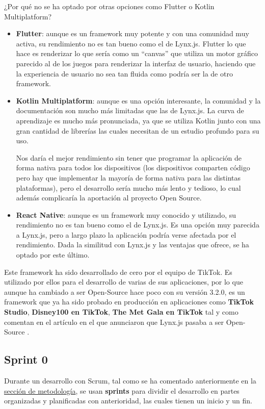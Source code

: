 ¿Por qué no se ha optado por otras opciones como Flutter o Kotlin Multiplatform?
\begin{itemize}
    \item \textbf{Flutter}: aunque es un framework muy potente y con una comunidad muy activa, su rendimiento no es tan bueno como el de Lynx.js.
        Flutter lo que hace es renderizar lo que sería como un ``canvas'' que utiliza un motor gráfico parecido al de los juegos para renderizar la interfaz de usuario, haciendo que la experiencia de usuario no sea tan fluida como podría ser la de otro framework.
    \item \textbf{Kotlin Multiplatform}: aunque es una opción interesante, la comunidad y la documentación son mucho más limitadas que las de Lynx.js. La curva de aprendizaje es mucho más pronunciada, ya que se utiliza Kotlin junto con una gran cantidad de librerías las cuales necesitan de un estudio profundo para su uso.

        Nos daría el mejor rendimiento sin tener que programar la aplicación de forma nativa para todos los dispositivos (los dispositivos comparten código pero hay que implementar la mayoría de forma nativa para las distintas plataformas), pero el desarrollo sería mucho más lento y tedioso, lo cual además complicaría la aportación al proyecto Open Source.
    \item \textbf{React Native}: aunque es un framework muy conocido y utilizado, su rendimiento no es tan bueno como el de Lynx.js.
        Es una opción muy parecida a Lynx.js, pero a largo plazo la aplicación podría verse afectada por el rendimiento.
        Dada la similitud con Lynx.js y las ventajas que ofrece, se ha optado por este último.
\end{itemize}

Este framework ha sido desarrollado de cero por el equipo de TikTok. Es utilizado por ellos para el desarrollo de varias de sus aplicaciones, por lo que aunque ha cambiado a ser Open-Source hace poco con su versión 3.2.0, es un framework que ya ha sido probado en producción en aplicaciones como \textbf{TikTok Studio}, \textbf{Disney100 en TikTok}, \textbf{The Met Gala en TikTok} tal y como comentan en el artículo en el que anunciaron que Lynx.js pasaba a ser Open-Source \parencite{lynx-article}.

\subsection{Sprint 0}
\label{sec:planificacion-inicial}
Durante un desarrollo con Scrum, tal como se ha comentado anteriormente en la \hyperref[sec:metodologia]{sección de metodología}, se usan \textbf{sprints} para dividir el desarrollo en partes organizadas y planificadas con anterioridad, las cuales tienen un inicio y un fin.


